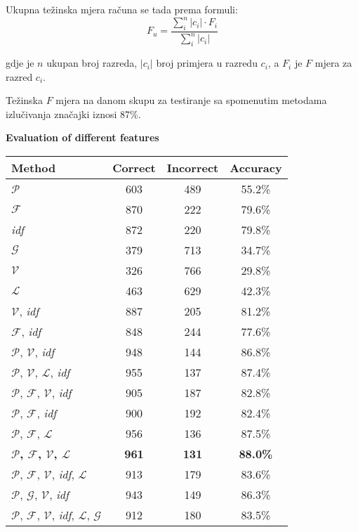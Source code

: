 \documentclass[11pt,english]{article}
\makeatletter
\newenvironment{tablehere}
  {\def\@captype{table}}
  {}
\makeatother
\begin{document}
\begin{multicols}{2}
Ukupna težinska mjera računa se tada prema formuli:
\begin{equation}
F_u = \frac{\sum^{n}_i |c_i|\cdot F_i}{\sum^n_i|c_i|}
\end{equation}

gdje je $n$ ukupan broj razreda, $|c_i|$ broj primjera u razredu $c_i$, a $F_i$
je $F$ mjera za razred $c_i$.

Težinska $F$ mjera na danom skupu za testiranje sa spomenutim metodama
izlučivanja značajki iznosi 87\%.

\begin{tablehere}
\centering%
\caption{\small \textbf{\textsf{Evaluation of different features}}}%
\begin{tabular}{l c c c}
\hline\hline
Method & Correct & Incorrect & Accuracy \\
[0.5ex]
\hline
$\mathcal{P}$ & 603 & 489 & 55.2\% \\
$\mathcal{F}$ & 870 & 222 & 79.6\% \\
\emph{idf} & 872 & 220 & 79.8\% \\
$\mathcal{G}$ & 379 & 713 & 34.7\% \\
$\mathcal{V}$ & 326 & 766 & 29.8\% \\
$\mathcal{L}$ & 463 & 629 & 42.3\% \\
$\mathcal{V}$, \emph{idf} & 887 & 205 & 81.2\% \\
$\mathcal{F}$, \emph{idf} & 848 & 244 & 77.6\% \\
$\mathcal{P}$, $\mathcal{V}$, \emph{idf} & 948 & 144 & 86.8\% \\
$\mathcal{P}$, $\mathcal{V}$, $\mathcal{L}$, \emph{idf} & 955 & 137 & 87.4\% \\
$\mathcal{P}$, $\mathcal{F}$, $\mathcal{V}$, \emph{idf} & 905 & 187 & 82.8\% \\
$\mathcal{P}$, $\mathcal{F}$, \emph{idf} & 900 & 192 & 82.4\% \\
$\mathcal{P}$, $\mathcal{F}$, $\mathcal{L}$ & 956 & 136 & 87.5\% \\
\textbf{$\mathcal{P}$, $\mathcal{F}$, $\mathcal{V}$, $\mathcal{L}$} & \textbf{961} & \textbf{131} & \textbf{88.0\%} \\
$\mathcal{P}$, $\mathcal{F}$, $\mathcal{V}$, \emph{idf}, $\mathcal{L}$ & 913 & 179 & 83.6\% \\
$\mathcal{P}$, $\mathcal{G}$, $\mathcal{V}$, \emph{idf} & 943 & 149 & 86.3\% \\
$\mathcal{P}$, $\mathcal{F}$, $\mathcal{V}$, \emph{idf}, $\mathcal{L}$, $\mathcal{G}$ & 912 & 180 & 83.5\% \\ [1ex]
\hline
\end{tabular}
\label{tbl:eval}%
\end{tablehere}%


\end{multicols}
\end{document}

